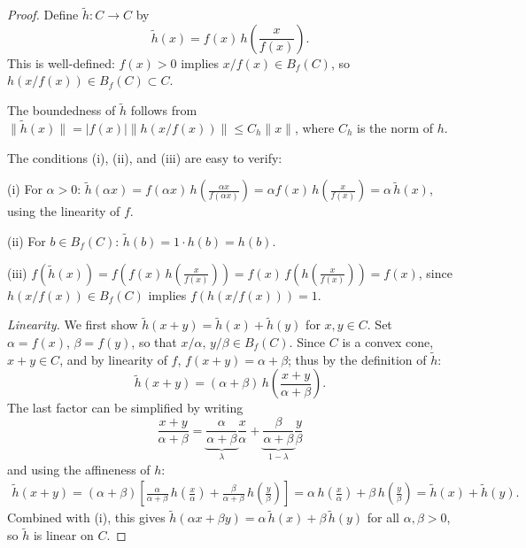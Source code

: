 \documentclass[10pt,a4paper]{amsart}
\begin{document}
\begin{proof}
Define $\tilde h: C \to C$ by 
\begin{equation*}
	\tilde h(x) = f(x)\, h\!\left(\frac{x}{f(x)}\right).
\end{equation*}
This is well-defined: $f(x) > 0$ implies $x/f(x) \in B_f(C)$, so $h(x/f(x)) \in B_f(C) \subset C$.

\noindent The boundedness of $\tilde h$ follows from $\| \tilde h (x) \| = |f(x)| \| h(x/f(x))\| \leq C_h \| x\|$, where $C_h$ is the norm of $h$.

\noindent The conditions (i), (ii), and (iii) are easy to verify:

(i) For $\alpha > 0$: $\tilde h(\alpha x) = f(\alpha x)\, h\!\left(\frac{\alpha x}{f(\alpha x)}\right) = \alpha f(x)\, h\!\left(\frac{x}{f(x)}\right) = \alpha\, \tilde h(x)$,
using the linearity of $f$.

(ii) For $b \in B_f(C)$: $\tilde h(b) = 1 \cdot h(b) = h(b)$.

(iii) $f(\tilde h(x)) = f\!\left(f(x)\, h\!\left(\frac{x}{f(x)}\right)\right) = f(x)\, f\!\left(h\!\left(\frac{x}{f(x)}\right)\right) = f(x)$,
since $h(x/f(x)) \in B_f(C)$ implies $f(h(x/f(x))) = 1$.

\noindent \emph{Linearity.} We first show $\tilde h(x+y) = \tilde h(x) + \tilde h(y)$ for $x,y \in C$.
Set $\alpha = f(x)$, $\beta = f(y)$, so that $x/\alpha,\, y/\beta \in B_f(C)$.
Since $C$ is a convex cone, $x+y \in C$, and by linearity of $f$, $f(x+y) = \alpha + \beta$; thus 
by the definition of $\tilde h$:
\begin{equation*}
\tilde h(x+y) = (\alpha + \beta)\, h\!\left(\frac{x+y}{\alpha + \beta}\right).
\end{equation*}
The last factor can be simplified by writing
\begin{equation*}
	\frac{x+y}{\alpha + \beta} = \underbrace{\frac{\alpha}{\alpha+\beta}}_{\lambda}\frac{x}{\alpha} 
	+ \underbrace{\frac{\beta}{\alpha+\beta}}_{1-\lambda}\frac{y}{\beta}
\end{equation*}
and using the affineness of $h$:
\begin{equation*}
\begin{split}
	\tilde h(x+y) %
	= (\alpha+\beta)\left[\frac{\alpha}{\alpha+\beta}\, h\!\left(\frac{x}{\alpha}\right) 
	+ \frac{\beta}{\alpha+\beta}\, h\!\left(\frac{y}{\beta}\right)\right]
	= \alpha\, h\!\left(\frac{x}{\alpha}\right) + \beta\, h\!\left(\frac{y}{\beta}\right) 
	= \tilde h(x) + \tilde h(y).
\end{split}
\end{equation*}
Combined with (i), this gives $\tilde h(\alpha x + \beta y) = \alpha\,\tilde h(x) + \beta\,\tilde h(y)$ for all $\alpha,\beta > 0$, so $\tilde h$ is linear on $C$.


\end{proof}
\end{document}

